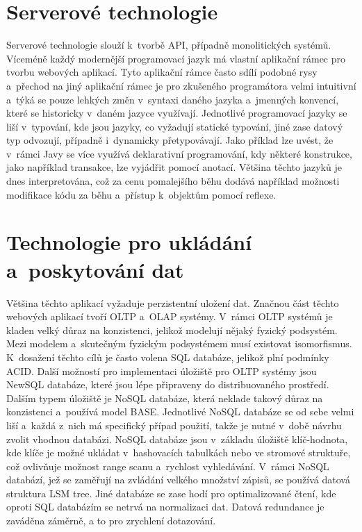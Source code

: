 \section{Serverové technologie}
Serverové technologie slouží k~tvorbě API, případně monolitických systémů. Víceméně každý modernější programovací jazyk má vlastní aplikační rámec pro tvorbu webových aplikací. Tyto aplikační rámce často sdílí podobné rysy a~přechod na jiný aplikační rámec je pro zkušeného programátora velmi intuitivní a~týká se pouze lehkých změn v~syntaxi daného jazyka a~jmenných konvencí, které se historicky v~daném jazyce využívají. Jednotlivé programovací jazyky se liší v~typování, kde jsou jazyky, co vyžadují statické typování, jiné zase datový typ odvozují, případně i~dynamicky přetypovávají. Jako příklad lze uvést, že v~rámci Javy se více využívá deklarativní programování, kdy některé konstrukce, jako například transakce, lze vyjádřit pomocí anotací. Většina těchto jazyků je dnes interpretována, což za cenu pomalejšího běhu dodává například možnosti modifikace kódu za běhu a~přístup k~objektům pomocí reflexe.

\section{Technologie pro ukládání a~poskytování dat}

Většina těchto aplikací vyžaduje perzistentní uložení dat. Značnou část těchto webových aplikací tvoří OLTP a~OLAP systémy. V~rámci OLTP systémů je kladen velký důraz na konzistenci, jelikož modelují nějaký fyzický podsystém. Mezi modelem a~skutečným fyzickým podsystémem musí existovat isomorfismus. K~dosažení těchto cílů je často volena SQL databáze, jelikož plní podmínky ACID. Další možností pro implementaci úložiště pro OLTP systémy jsou NewSQL databáze, které jsou lépe připraveny do distribuovaného prostředí.
\newpara
Dalším typem úložiště je NoSQL databáze, která neklade takový důraz na konzistenci a~používá model BASE. Jednotlivé NoSQL databáze se od sebe velmi liší a~každá z~nich má specifický případ použití, takže je nutné v~době návrhu zvolit vhodnou databázi. NoSQL databáze jsou v~základu úložiště klíč-hodnota, kde klíče je možné ukládat v~hashovacích tabulkách nebo ve stromové struktuře, což ovlivňuje možnost range scanu a~rychlost vyhledávání. V~rámci NoSQL databází, jež se zaměřují na zvládání velkého množství zápisů, se používá datová struktura LSM tree. Jiné databáze se zase hodí pro optimalizované čtení, kde oproti SQL databázím se netrvá na normalizaci dat. Datová redundance je zaváděna záměrně, a to pro zrychlení dotazování.


